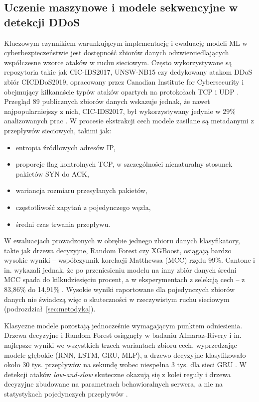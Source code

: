 \documentclass[a4paper,12pt]{article}
\begin{document}
\subsection{Uczenie maszynowe i modele sekwencyjne w detekcji DDoS}\label{sec:ml}
Kluczowym czynnikiem warunkującym implementację i ewaluację modeli ML w cyberbezpieczeństwie jest dostępność zbiorów danych odzwierciedlających współczesne wzorce ataków w ruchu sieciowym. Często wykorzystywane są repozytoria takie jak CIC-IDS2017, UNSW-NB15 czy dedykowany atakom DDoS zbiór CICDDoS2019, opracowany przez Canadian Institute for Cybersecurity i obejmujący kilkanaście typów ataków opartych na protokołach TCP i UDP \cite{karrakchou2025collaborative}. Przegląd 89 publicznych zbiorów danych wskazuje jednak, że nawet najpopularniejszy z nich, CIC-IDS2017, był wykorzystywany jedynie w 29\% analizowanych prac \cite{goldschmidt2025network}. W procesie ekstrakcji cech modele zasilane są metadanymi z przepływów sieciowych, takimi jak:
\begin{itemize}
    \item entropia źródłowych adresów IP,
    \item proporcje flag kontrolnych TCP, w szczególności nienaturalny stosunek pakietów SYN do ACK,
    \item wariancja rozmiaru przesyłanych pakietów,
    \item częstotliwość zapytań z pojedynczego węzła,
    \item średni czas trwania przepływu.
\end{itemize}

W ewaluacjach prowadzonych w obrębie jednego zbioru danych klasyfikatory, takie jak drzewa decyzyjne, Random Forest czy XGBoost, osiągają bardzo wysokie wyniki -- współczynnik korelacji Matthewsa (MCC) rzędu 99\%. Cantone i in. wykazali jednak, że po przeniesieniu modelu na inny zbiór danych średni MCC spada do kilkudziesięciu procent, a w eksperymentach z selekcją cech -- z 83,86\% do 14,91\% \cite{cantone2024machine}. Wysokie wyniki raportowane dla pojedynczych zbiorów danych nie świadczą więc o skuteczności w rzeczywistym ruchu sieciowym (podrozdział~\ref{sec:metodyka}).

Klasyczne modele pozostają jednocześnie wymagającym punktem odniesienia. Drzewa decyzyjne i Random Forest osiągnęły w badaniu Almaraz-Rivery i in. najlepsze wyniki we wszystkich trzech wariantach zbioru cech, wyprzedzając modele głębokie (RNN, LSTM, GRU, MLP), a drzewo decyzyjne klasyfikowało około 30 tys. przepływów na sekundę wobec niespełna 3 tys. dla sieci GRU \cite{almarazrivera2022transport}. W detekcji ataków \textit{low-and-slow} skuteczne okazują się z kolei reguły i drzewa decyzyjne zbudowane na parametrach behawioralnych serwera, a nie na statystykach pojedynczych przepływów \cite{sood2023slowtrack}.
\end{document}
